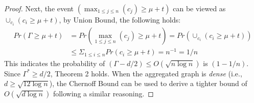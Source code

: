 \begin{proof}
Next, the event $(\max_{1 \leq j \leq n}(c_j) \geq \mu + t)$ can be viewed as
$\cup_{c_i} (c_i \geq \mu + t )$, by Union Bound, the following holds:
\begin{equation*}
\begin{split}
	Pr(\Gamma \geq \mu + t) &=Pr(\max_{1\leq j \leq n}(c_j) \geq \mu + t) = Pr(\cup_{c_i} (c_i \geq \mu + t )) \\
		&\leq \Sigma_{1 \leq i \leq n} Pr(c_i \geq \mu + t) = n^{-1} = 1/n
\end{split}
\end{equation*}
This indicates the probability of $(\Gamma-d/2) \leq O(\sqrt{n\log n})$ is $(1-1/n)$. 
Since $\Gamma^* \geq d/2$, Theorem 2 holds.
When the aggregated graph is \emph{dense} (i.e., $d\geq \sqrt{12 \log n}$),
the Chernoff Bound can be used to derive a tighter bound of 
$O(\sqrt{d\log n}) $ following a similar reasoning.
\end{proof}


